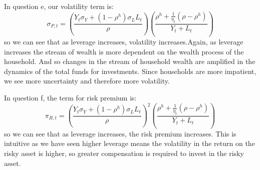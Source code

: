 \documentclass{article}
\begin{document}
In question e, our volatility term is:
\[
    \sigma_{P, t} = \left(\frac{Y_t \sigma_Y + (1 - \rho^h) \sigma_L L_t}{\rho}\right) \left(\frac{\rho^h + \frac{1}{\eta_t}(\rho-\rho^h)}{Y_{t} + L_t} \right)    
\]
so we can see that as leverage increases, volatility increases.Again, as leverage increases the stream of wealth is more dependent on the wealth process of the household. And so changes in the stream of household wealth are amplified in the dynamics of the total funds for investments. Since households are more impatient, we see more uncertainty and therefore more volatility. 

In question f, the term for risk premium is:
\[
    \pi_{R, t} = \left(\frac{Y_t \sigma_Y + (1 - \rho^h) \sigma_L L_t}{\rho}\right)^2 \left(\frac{\rho^h + \frac{1}{\eta_t}(\rho-\rho^h)}{Y_{t} + L_t} \right)
\]
so we can see that as leverage increases, the risk premium increases. This is intuitive as we have seen higher leverage means the volatility in the return on the risky asset is higher, so greater compensation is required to invest in the risky asset.
\end{document}
